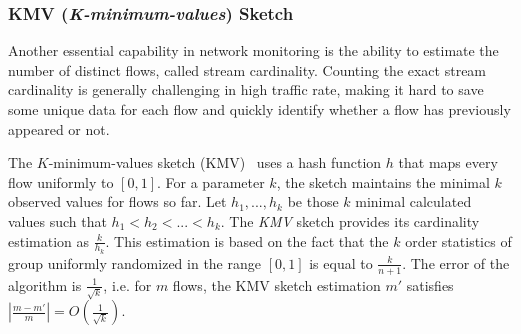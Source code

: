 \subsubsection{KMV (\emph{K-minimum-values}) Sketch}  \label{sktc-ssec:kmv}

Another essential capability in network monitoring is the ability to estimate the number of distinct flows, called stream cardinality. Counting the exact stream cardinality is generally challenging in high traffic rate, making it hard to save some unique data for each flow and quickly identify whether a flow has previously appeared or not. 

The $K$-minimum-values sketch (KMV)~\cite{giroire2009order, KMV} uses a hash function $h$ that maps every flow uniformly to $[0,1]$. For a parameter $k$, the sketch maintains the minimal $k$ observed values for flows so far. Let $h_1,...,h_k$ be those $k$ minimal calculated values such that $h_1<h_2<...<h_k$. The \emph{KMV} sketch provides its cardinality estimation as $\frac{k}{h_k}$. This estimation is based on the fact that the $k$ order statistics of group uniformly randomized in the range $[0,1]$ is equal to $\frac{k}{n+1}$. The error of the algorithm is $\frac{1}{\sqrt{k}}$, i.e.  for $m$ flows, the KMV sketch estimation $m'$ satisfies $\left|\frac{m-m'}{m}\right| = O(\frac{1}{\sqrt{k}})$.

